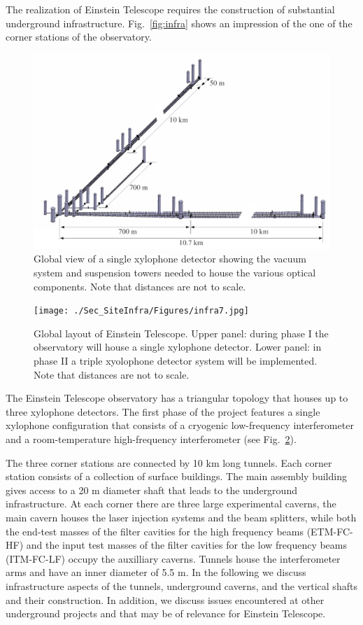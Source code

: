 The realization of Einstein Telescope requires the construction of substantial underground infrastructure. Fig.~\ref{fig:infra} shows an impression of the one of the corner stations of the observatory.
\begin{figure}[htbp!]
\centering
\includegraphics[width=14cm]{./Sec_SiteInfra/Figures/infra2.jpg}
\caption{Global view of a single xylophone detector showing the vacuum system and suspension towers needed to house the various optical components. Note that distances are not to scale.}
\label{fig:infra2}
\end{figure}

\begin{figure}[htbp!]
\centering
\texttt{[image: ./Sec\_SiteInfra/Figures/infra7.jpg]}
\caption{Global layout of Einstein Telescope. Upper panel: during phase I the observatory will house a single xylophone detector. Lower panel: in phase II a triple xyolophone detector system will be implemented. Note that distances are not to scale.}
\label{fig:infra1}
\end{figure}
The Einstein Telescope observatory has a triangular topology that houses up to three xylophone detectors. The first phase of the project features a single xylophone configuration that consists of a cryogenic low-frequency interferometer and a room-temperature high-frequency  interferometer (see Fig.~\ref{fig:infra1}).

The three corner stations are connected by 10 km long tunnels. Each corner station consists of a collection of surface buildings. The main assembly building gives access to a 20 m diameter shaft that leads to the underground infrastructure. At each corner there are three large experimental caverns, the main cavern houses the laser injection systems and the beam splitters, while both the end-test masses of the filter cavities for the high frequency beams (ETM-FC-HF) and the input test masses of the filter cavities for the low frequency beams (ITM-FC-LF) occupy the auxilliary caverns. Tunnels house the interferometer arms and have an inner diameter of 5.5 m. In the following we discuss infrastructure aspects of the tunnels, underground caverns, and the vertical shafts and their construction. In addition, we discuss issues encountered at other underground projects and that may be of relevance for Einstein Telescope.

